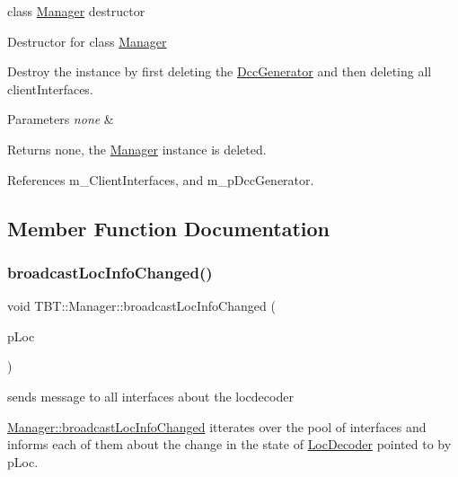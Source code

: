 class \hyperlink{classTBT_1_1Manager}{Manager} destructor 

Destructor for class \hyperlink{classTBT_1_1Manager}{Manager}

Destroy the instance by first deleting the \hyperlink{classTBT_1_1DccGenerator}{Dcc\+Generator} and then deleting all client\+Interfaces.


\begin{DoxyParams}{Parameters}
{\em none} & \\
\hline
\end{DoxyParams}
\begin{DoxyReturn}{Returns}
none, the \hyperlink{classTBT_1_1Manager}{Manager} instance is deleted. 
\end{DoxyReturn}


References m\+\_\+\+Client\+Interfaces, and m\+\_\+p\+Dcc\+Generator.



\subsection{Member Function Documentation}
\mbox{\label{classTBT_1_1Manager_aaac6dc1a57d9c578a3da2243584a8a22_aaac6dc1a57d9c578a3da2243584a8a22}} 
\subsubsection{\texorpdfstring{broadcast\+Loc\+Info\+Changed()}{broadcastLocInfoChanged()}}
{\footnotesize\ttfamily void T\+B\+T\+::\+Manager\+::broadcast\+Loc\+Info\+Changed (\begin{DoxyParamCaption}\item[{\hyperlink{classTBT_1_1LocDecoder}{Loc\+Decoder} $\ast$}]{p\+Loc }\end{DoxyParamCaption})}



sends message to all interfaces about the locdecoder 

\hyperlink{classTBT_1_1Manager_aaac6dc1a57d9c578a3da2243584a8a22_aaac6dc1a57d9c578a3da2243584a8a22}{Manager\+::broadcast\+Loc\+Info\+Changed} itterates over the pool of interfaces and informs each of them about the change in the state of \hyperlink{classTBT_1_1LocDecoder}{Loc\+Decoder} pointed to by p\+Loc.


